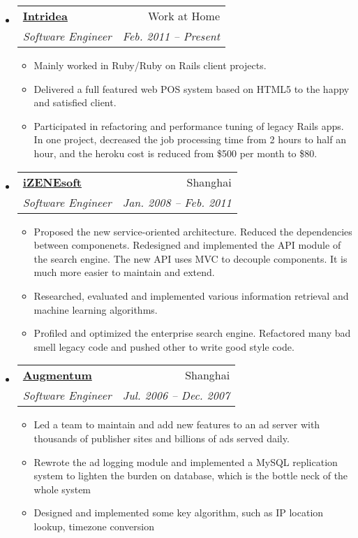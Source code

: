 \documentclass[letterpaper,11pt]{article}
\makeatletter
\newcommand{\resitem}[1]{\item #1 \vspace{-2pt}}
\newcommand{\ressubheading}[4]{
\begin{tabular*}{6.5in}{l@{\extracolsep{\fill}}r}
		\textbf{#1} & #2 \\
		\textit{#3} & \textit{#4} \\
\end{tabular*}\vspace{-6pt}}
\makeatother
\begin{document}
\begin{itemize}
\item
  \ressubheading{\href{http://www.intridea.com}{Intridea}}{Work at Home}{%
    Software Engineer}{Feb. 2011 -- Present}

  { \footnotesize
    \begin{itemize}
      \resitem{Mainly worked in Ruby/Ruby on Rails client projects.}

      \resitem{Delivered a full featured web POS system based on HTML5 to the
        happy and satisfied client.}

      \resitem{Participated in refactoring and performance tuning of legacy
        Rails apps. In one project, decreased the job processing time from 2 hours to half an hour, and the heroku cost is
        reduced from \$500 per month to \$80.}
    \end{itemize}
  }

\item
  \ressubheading{\href{http://www.izenesoft.com/EN/home.html}{iZENEsoft}}{Shanghai}{%
    Software Engineer}{Jan. 2008 -- Feb. 2011}

  { \footnotesize
    \begin{itemize}
      \resitem{Proposed the new service-oriented architecture. Reduced the
        dependencies between componenets. Redesigned and implemented the API
        module of the search engine. The new API uses MVC to decouple
        components. It is much more easier to maintain and extend.}

      \resitem{Researched, evaluated and implemented various information
        retrieval and machine learning algorithms.}

      \resitem{Profiled and optimized the enterprise search engine. Refactored
        many bad smell legacy code and pushed other to write good style code.}

    \end{itemize}
  }

\item \ressubheading{\href{http://www.augmentum.com/}{Augmentum}}{Shanghai}{%
      Software Engineer}{Jul. 2006 -- Dec. 2007}

  { \footnotesize
    \begin{itemize}
      \resitem{Led a team to maintain and add new features to an ad server with
        thousands of publisher sites and billions of ads served
        daily.}
      
      \resitem{Rewrote the ad logging module and implemented a MySQL replication
        system to lighten the burden on database, which is the bottle neck of
        the whole system}
      
      \resitem{Designed and implemented some key algorithm, such as IP location
        lookup, timezone conversion}

    \end{itemize}
  }
\end{itemize}
\end{document}
